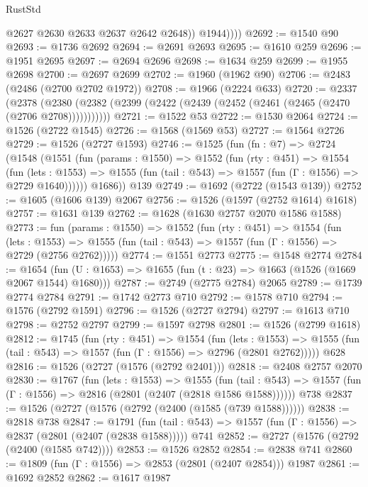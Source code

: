 \begin{lexlean}{RustStd}
\begin{coremodule}
                @2627
                @2630
                @2633
                @2637
                @2642
                @2648))
            @1944))))
@2692 := @1540 @90
@2693 := @1736 @2692
@2694 := @2691 @2693
@2695 := @1610 @259
@2696 := @1951 @2695
@2697 := @2694 @2696
@2698 := @1634 @259
@2699 := @1955 @2698
@2700 := @2697 @2699
@2702 := @1960 (@1962 @90)
@2706 := @2483 (@2486 (@2700 @2702 @1972))
@2708 := @1966 (@2224 @633)
@2720 := @2337
    (@2378 (@2380 (@2382 (@2399 (@2422 (@2439 (@2452 (@2461 (@2465 (@2470 (@2706 @2708)))))))))))
@2721 := @1522 @53
@2722 := @1530 @2064
@2724 := @1526 (@2722 @1545)
@2726 := @1568 (@1569 @53)
@2727 := @1564 @2726
@2729 := @1526 (@2727 @1593)
@2746 := @1525
    (fun (fn : @7) =>
    @2724
      (@1548
        (@1551
          (fun (params : @1550) =>
          @1552
            (fun (rty : @451) =>
            @1554
              (fun (lets : @1553) =>
              @1555 (fun (tail : @543) => @1557 (fun (Γ : @1556) => @2729 @1640))))))
        @1686))
    @139
@2749 := @1692 (@2722 (@1543 @139))
@2752 := @1605 (@1606 @139) @2067
@2756 := @1526 (@1597 (@2752 @1614) @1618)
@2757 := @1631 @139
@2762 := @1628 (@1630 @2757 @2070 @1586 @1588)
@2773 := fun (params : @1550) =>
  @1552
    (fun (rty : @451) =>
    @1554
      (fun (lets : @1553) =>
      @1555 (fun (tail : @543) => @1557 (fun (Γ : @1556) => @2729 (@2756 @2762)))))
@2774 := @1551 @2773
@2775 := @1548 @2774
@2784 := @1654 (fun (U : @1653) => @1655 (fun (t : @23) => @1663 (@1526 (@1669 @2067 @1544) @1680)))
@2787 := @2749 (@2775 @2784) @2065
@2789 := @1739 @2774 @2784
@2791 := @1742 @2773 @710
@2792 := @1578 @710
@2794 := @1576 (@2792 @1591)
@2796 := @1526 (@2727 @2794)
@2797 := @1613 @710
@2798 := @2752 @2797
@2799 := @1597 @2798
@2801 := @1526 (@2799 @1618)
@2812 := @1745
    (fun (rty : @451) =>
    @1554
      (fun (lets : @1553) =>
      @1555 (fun (tail : @543) => @1557 (fun (Γ : @1556) => @2796 (@2801 @2762)))))
    @628
@2816 := @1526 (@2727 (@1576 (@2792 @2401)))
@2818 := @2408 @2757 @2070
@2830 := @1767
    (fun (lets : @1553) =>
    @1555
      (fun (tail : @543) => @1557 (fun (Γ : @1556) => @2816 (@2801 (@2407 (@2818 @1586 @1588))))))
    @738
@2837 := @1526 (@2727 (@1576 (@2792 (@2400 (@1585 (@739 @1588))))))
@2838 := @2818 @738
@2847 := @1791
    (fun (tail : @543) => @1557 (fun (Γ : @1556) => @2837 (@2801 (@2407 (@2838 @1588)))))
    @741
@2852 := @2727 (@1576 (@2792 (@2400 (@1585 @742))))
@2853 := @1526 @2852
@2854 := @2838 @741
@2860 := @1809 (fun (Γ : @1556) => @2853 (@2801 (@2407 @2854))) @1987
@2861 := @1692 @2852
@2862 := @1617 @1987

\end{coremodule}
\end{lexlean}
